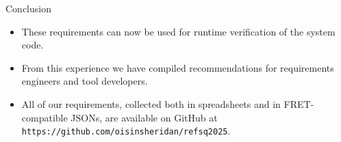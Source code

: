 \documentclass[11pt, aspectratio=169, table]{beamer}
\begin{document}
\begin{frame}
\begin{block}{Conclusion}
\begin{itemize}
	\item These requirements can now be used for runtime verification of the system code.
	
	\item From this experience we have compiled recommendations for requirements engineers and tool developers.
	
	\item All of our requirements, collected both in spreadsheets and in FRET-compatible JSONs, are available on GitHub at \texttt{https://github.com/oisinsheridan/refsq2025}.
\end{itemize}
\end{block}
  
\end{frame}
\end{document}
